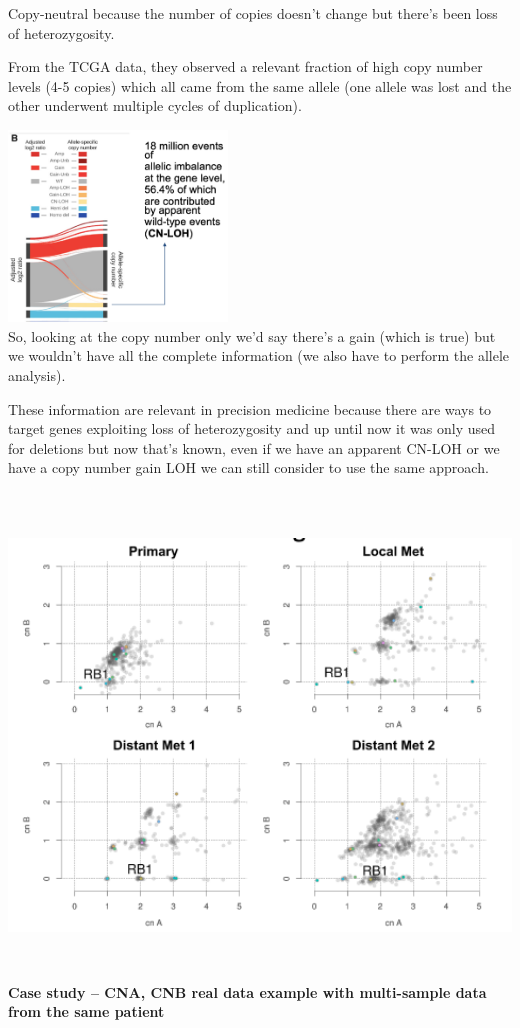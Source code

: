 Copy-neutral because the number of copies doesn't change but there's been loss
of heterozygosity.

From the TCGA data, they observed a relevant fraction of high copy number levels
(4-5 copies) which all came from the same allele (one allele was lost and the
other underwent multiple cycles of duplication).

\includegraphics[width=2.29167in,height=2.00347in]{image14.png}\\

So, looking at
the copy number only we'd say there's a gain (which is true) but we wouldn't
have all the complete information (we also have to perform the allele analysis).

These information are relevant in precision medicine because there are ways to
target genes exploiting loss of heterozygosity and up until now it was only used
for deletions but now that's known, even if we have an apparent CN-LOH or we
have a copy number gain LOH we can still consider to use the same approach.

\includegraphics[width=6.58333in,height=5.0625in]{image15.png}\textbf{Case study
-- CNA, CNB real data example with multi-sample data from the same patient}\\

